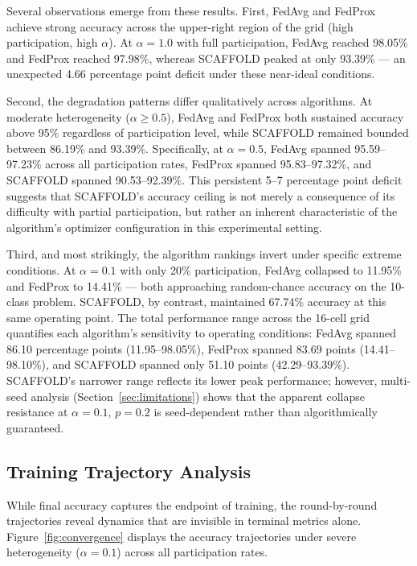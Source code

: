 \documentclass[conference]{IEEEtran}
\begin{document}
Several observations emerge from these results. First, FedAvg and FedProx achieve strong accuracy across the upper-right region of the grid (high participation, high $\alpha$). At $\alpha = 1.0$ with full participation, FedAvg reached 98.05\% and FedProx reached 97.98\%, whereas SCAFFOLD peaked at only 93.39\% --- an unexpected 4.66 percentage point deficit under these near-ideal conditions.

Second, the degradation patterns differ qualitatively across algorithms. At moderate heterogeneity ($\alpha \geq 0.5$), FedAvg and FedProx both sustained accuracy above 95\% regardless of participation level, while SCAFFOLD remained bounded between 86.19\% and 93.39\%. Specifically, at $\alpha = 0.5$, FedAvg spanned 95.59--97.23\% across all participation rates, FedProx spanned 95.83--97.32\%, and SCAFFOLD spanned 90.53--92.39\%. This persistent 5--7 percentage point deficit suggests that SCAFFOLD's accuracy ceiling is not merely a consequence of its difficulty with partial participation, but rather an inherent characteristic of the algorithm's optimizer configuration in this experimental setting.

Third, and most strikingly, the algorithm rankings invert under specific extreme conditions. At $\alpha = 0.1$ with only 20\% participation, FedAvg collapsed to 11.95\% and FedProx to 14.41\% --- both approaching random-chance accuracy on the 10-class problem. SCAFFOLD, by contrast, maintained 67.74\% accuracy at this same operating point. The total performance range across the 16-cell grid quantifies each algorithm's sensitivity to operating conditions: FedAvg spanned 86.10 percentage points (11.95--98.05\%), FedProx spanned 83.69 points (14.41--98.10\%), and SCAFFOLD spanned only 51.10 points (42.29--93.39\%). SCAFFOLD's narrower range reflects its lower peak performance; however, multi-seed analysis (Section~\ref{sec:limitations}) shows that the apparent collapse resistance at $\alpha = 0.1$, $p = 0.2$ is seed-dependent rather than algorithmically guaranteed.

\subsection{Training Trajectory Analysis}

While final accuracy captures the endpoint of training, the round-by-round trajectories reveal dynamics that are invisible in terminal metrics alone. Figure~\ref{fig:convergence} displays the accuracy trajectories under severe heterogeneity ($\alpha = 0.1$) across all participation rates.
\end{document}

